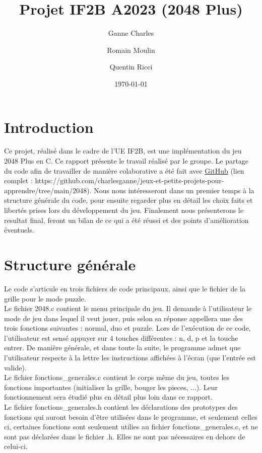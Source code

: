 \documentclass[12pt]{article}
\date{\today}
\author{Ganne Charles \and Romain Moulin\and Quentin Ricci}
\title{Projet IF2B A2023 (2048 Plus)}
\begin{document}
\maketitle
\tableofcontents
\newpage
\section{Introduction}

\indent Ce projet, réalisé dans le cadre de l'UE IF2B, est une implémentation du jeu 2048 Plus en C. Ce rapport présente le travail réalisé par le groupe. Le partage du code afin de travailler de manière colaborative a été fait avec \href{https://github.com/charlesganne/jeux-et-petits-projets-pour-apprendre/tree/main/2048}{GitHub} (lien complet  : https://github.com/charlesganne/jeux-et-petits-projets-pour-apprendre/tree/main/2048). Nous nous intéresseront dans un premier temps à la structure générale du code, pour ensuite regarder plus en détail les choix faits et libertés prises lors du développement du jeu. Finalement nous présenterons le resultat final, feront un bilan  de ce qui a été réussi et des points d'amélioration éventuels.

\section{Structure générale}

\indent Le code s'articule en trois fichiers de code principaux, ainsi que le fichier de la grille pour le mode puzzle.\\

\indent Le fichier 2048.c contient le menu principale du jeu. Il demande à l'utilisateur le mode de jeu dans lequel il veut jouer, puis selon sa réponse appellera une des trois fonctions suivantes : normal, duo et puzzle. Lors de l'exécution de ce code, l'utilisateur est sensé appuyer sur 4 touches différentes : n, d, p et la touche entrer. De manière générale, et dans toute la suite, le programme admet que l'utilisateur respecte à la lettre les instructions affichées à l'écran (que l'entrée est valide).\\

\indent Le fichier fonctions\_generales.c contient le corps même du jeu, toutes les fonctions importantes (initialiser la grille, bouger les pieces, ...). Leur fonctionnement sera étudié plus en détail plus loin dans ce rapport.\\

\indent Le fichier fonctions\_generales.h contient les déclarations des prototypes des fonctions qui auront besoin d'être utilisées dans le programme, et seulement celles ci, certaines fonctions sont seulement utilies au fichier fonctions\_generales.c, et ne sont pas déclarées dans le fichier .h. Elles ne sont pas nécessaires en dehors de celui-ci.\\
\end{document}
